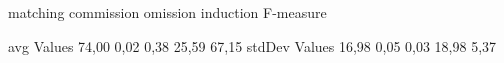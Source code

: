                 matching commission   omission  induction    F-measure   

avg Values      74,00       0,02       0,38      25,59         67,15      
stdDev Values    16,98       0,05       0,03      18,98         5,37

